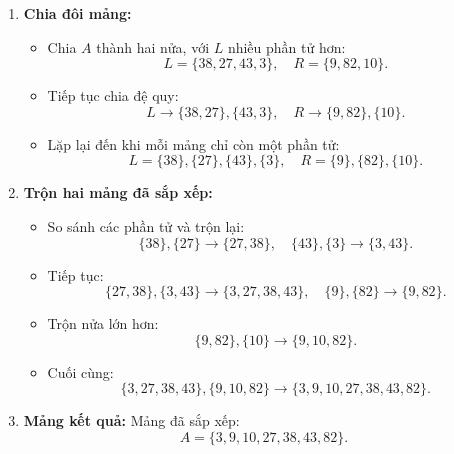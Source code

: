 \begin{enumerate}
    \item \textbf{Chia đôi mảng:}
    \begin{itemize}
        \item Chia \( A \) thành hai nửa, với \( L \) nhiều phần tử hơn:
        \[
        L = \{38, 27, 43, 3\}, \quad R = \{9, 82, 10\}.
        \]
        \item Tiếp tục chia đệ quy:
        \[
        L \rightarrow \{38, 27\}, \{43, 3\}, \quad R \rightarrow \{9, 82\}, \{10\}.
        \]
        \item Lặp lại đến khi mỗi mảng chỉ còn một phần tử:
        \[
        L = \{38\}, \{27\}, \{43\}, \{3\}, \quad R = \{9\}, \{82\}, \{10\}.
        \]
    \end{itemize}
    
    \item \textbf{Trộn hai mảng đã sắp xếp:}
    \begin{itemize}
        \item So sánh các phần tử và trộn lại:
        \[
        \{38\}, \{27\} \rightarrow \{27, 38\}, \quad \{43\}, \{3\} \rightarrow \{3, 43\}.
        \]
        \item Tiếp tục:
        \[
        \{27, 38\}, \{3, 43\} \rightarrow \{3, 27, 38, 43\}, \quad \{9\}, \{82\} \rightarrow \{9, 82\}.
        \]
        \item Trộn nửa lớn hơn:
        \[
        \{9, 82\}, \{10\} \rightarrow \{9, 10, 82\}.
        \]
        \item Cuối cùng:
        \[
        \{3, 27, 38, 43\}, \{9, 10, 82\} \rightarrow \{3, 9, 10, 27, 38, 43, 82\}.
        \]
    \end{itemize}

    \item \textbf{Mảng kết quả:}
    Mảng đã sắp xếp:
    \[
    A = \{3, 9, 10, 27, 38, 43, 82\}.
    \]

\end{enumerate}


